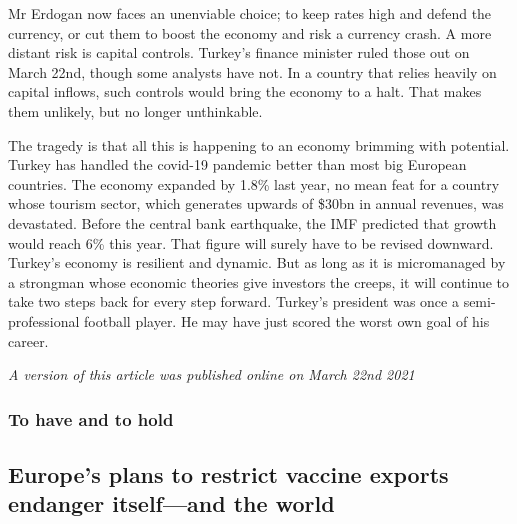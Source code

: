 \documentclass{article}
\begin{document}
Mr Erdogan now faces an unenviable choice; to keep rates high and defend the currency, or cut them to boost the economy and risk a currency crash. A more distant risk is capital controls. Turkey's finance minister ruled those out on March 22nd, though some analysts have not. In a country that relies heavily on capital inflows, such controls would bring the economy to a halt. That makes them unlikely, but no longer unthinkable. 

The tragedy is that all this is happening to an economy brimming with potential. Turkey has handled the covid-19 pandemic better than most big European countries. The economy expanded by 1.8\% last year, no mean feat for a country whose tourism sector, which generates upwards of \$30bn in annual revenues, was devastated. Before the central bank earthquake, the IMF predicted that growth would reach 6\% this year. That figure will surely have to be revised downward. Turkey's economy is resilient and dynamic. But as long as it is micromanaged by a strongman whose economic theories give investors the creeps, it will continue to take two steps back for every step forward. Turkey's president was once a semi-professional football player. He may have just scored the worst own goal of his career. {} 

\emph{A version of this article was published online on March 22nd 2021} 
\clearpage
\subsubsection{To have and to hold }
\subsection{Europe's plans to restrict vaccine exports endanger itself---and the world }
\end{document}
